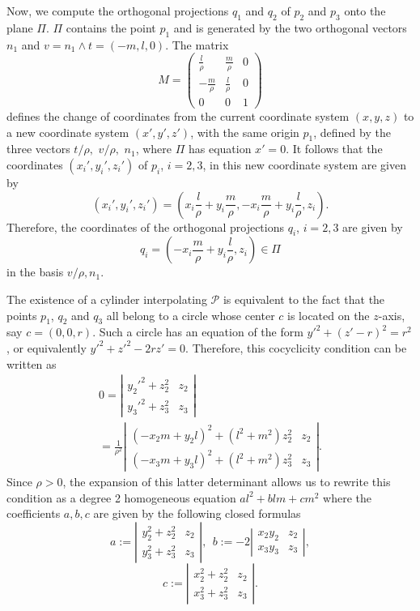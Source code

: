 \documentclass[5p]{elsarticle}
\newcommand\Pc{\mathcal P}
\newcommand{\com}[1]{{\color{black} #1}}
\begin{document}
Now, we compute the orthogonal projections $q_1$ and $q_2$ of $p_2$ and $p_3$ onto the plane $\Pi$. $\Pi$ contains the point $p_1$ and is generated by the two orthogonal vectors $n_1$ and $v=n_1\wedge t=(-m,l,0)$. The matrix
$$M=
\left(
\begin{array}{ccc}
	\frac{l}{\rho} & \frac{m}{\rho} & 0 \\
	- \frac{m}{\rho} & \frac{l}{\rho} & 0 \\
	0 & 0 & 1
\end{array}
\right)$$
defines the change of coordinates from the current coordinate system $(x,y,z)$ to a new coordinate  system $(x',y',z')$, with the same origin $p_1$, defined by the three vectors $t/\rho,$ $v/\rho,$ $n_1$, where $\Pi$ has equation $x'=0$. It follows that the coordinates $(x_i',y_i',z_i')$ of $p_i$, $i=2,3$, in this new coordinate system are given by
$$(x_i',y_i',z_i')=\left(x_i\frac{l}{\rho}+y_i \frac{m}{\rho}, - x_i\frac{m}{\rho}+ y_i\frac{l}{\rho} , z_i\right).$$
Therefore, the coordinates of the orthogonal projections $q_i$, $i=2,3$ are given by
$$q_i=\left(- x_i\frac{m}{\rho}+ y_i\frac{l}{\rho} , z_i\right) \in \Pi$$
in the basis $v/\rho,n_1$. 

The existence of a cylinder interpolating $\Pc$ is equivalent to the fact that the points $p_1$, $q_2$ and $q_3$ \com{all belong to} a circle whose center $c$ is located on the $z$-axis, say $c=(0,0,r)$. Such a circle has an equation of the form $y'^2+(z'-r)^2=r^2$, or equivalently $y'^2+z'^2-2rz'=0$. Therefore, this cocyclicity condition can be written as
\begin{multline*}
0=\left| 
\begin{array}{cc}
 y_2'^2+z_2^2 & z_2 \\
y_3'^2+z_3^2 & z_3 
\end{array}
\right| \\
=\frac{1}{\rho^2}
\left| 
\begin{array}{cc}
\left(- x_2m+ y_2l\right)^2 + (l^2+m^2)z_2^2 & z_2 \\
\left(- x_3m+ y_3l\right)^2 + (l^2+m^2)z_3^2 & z_3 
\end{array}
\right|.
\end{multline*}
Since $\rho>0$, the expansion of this latter determinant \com{allows us to} rewrite this condition as a
degree 2 homogeneous equation $al^2+blm+cm^2$ where the coefficients $a,b,c$ are given by the following closed formulas
$$
a:=\left|
\begin{array}{cc}
	y_2^2+z_2^2 & z_2 \\
	y_3^2+z_3^2 & z_3
\end{array}\right|, \ \
b:=-2\left|
\begin{array}{cc}
	x_2y_2 & z_2 \\
	x_3y_3 & z_3
\end{array}\right|, $$
$$c:=\left|
\begin{array}{cc}
	x_2^2+z_2^2 & z_2 \\
	x_3^2+z_3^2 & z_3
\end{array}\right|.
$$
   
\end{document}
